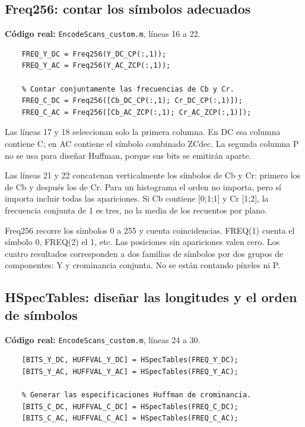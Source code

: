 \documentclass[11pt,a4paper,oneside]{report}
\begin{document}
\par\medskip\noindent\begin{minipage}{\linewidth}

\subsection{Freq256: contar los símbolos adecuados}

\textbf{Código real:} \texttt{EncodeScans\_custom.m}, líneas 16 a 22.

\begin{lstlisting}[firstnumber=16]
    % Contar las frecuencias de luminancia.
    FREQ_Y_DC = Freq256(Y_DC_CP(:,1));
    FREQ_Y_AC = Freq256(Y_AC_ZCP(:,1));

    % Contar conjuntamente las frecuencias de Cb y Cr.
    FREQ_C_DC = Freq256([Cb_DC_CP(:,1); Cr_DC_CP(:,1)]);
    FREQ_C_AC = Freq256([Cb_AC_ZCP(:,1); Cr_AC_ZCP(:,1)]);
\end{lstlisting}

\end{minipage}\par


Las líneas 17 y 18 seleccionan solo la primera columna. En DC esa columna
contiene C; en AC contiene el símbolo combinado ZCdec. La segunda columna P
no se usa para diseñar Huffman, porque sus bits se emitirán aparte.

Las líneas 21 y 22 concatenan verticalmente los símbolos de Cb y Cr: primero
los de Cb y después los de Cr. Para un histograma el orden no importa, pero
sí importa incluir todas las apariciones. Si Cb contiene [0;1;1] y Cr [1;2],
la frecuencia conjunta de 1 es tres, no la media de los recuentos por plano.

Freq256 recorre los símbolos 0 a 255 y cuenta coincidencias. FREQ(1) cuenta
el símbolo 0, FREQ(2) el 1, etc. Las posiciones sin apariciones valen cero.
Los cuatro resultados corresponden a dos familias de símbolos por dos grupos
de componentes: Y y crominancia conjunta. No se están contando píxeles ni P.


\par\medskip\noindent\begin{minipage}{\linewidth}

\subsection{HSpecTables: diseñar las longitudes y el orden de símbolos}

\textbf{Código real:} \texttt{EncodeScans\_custom.m}, líneas 24 a 30.

\begin{lstlisting}[firstnumber=24]
    % Generar las especificaciones Huffman de luminancia.
    [BITS_Y_DC, HUFFVAL_Y_DC] = HSpecTables(FREQ_Y_DC);
    [BITS_Y_AC, HUFFVAL_Y_AC] = HSpecTables(FREQ_Y_AC);

    % Generar las especificaciones Huffman de crominancia.
    [BITS_C_DC, HUFFVAL_C_DC] = HSpecTables(FREQ_C_DC);
    [BITS_C_AC, HUFFVAL_C_AC] = HSpecTables(FREQ_C_AC);
\end{lstlisting}

\end{minipage}\par
\end{document}
